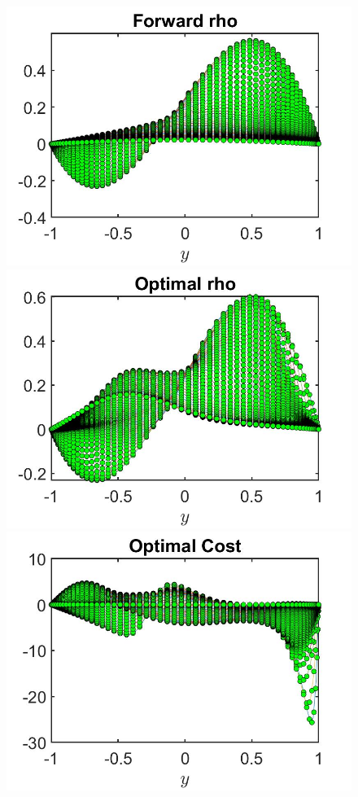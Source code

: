 \documentclass[11pt, a4paper]{article}
\theoremstyle{definition}
\begin{document}
\begin{figure}[h]
	\includegraphics[scale=0.3]{DFlrhoFW1.jpg}	
	\includegraphics[scale=0.3]{DFlrhoOpt1.jpg}
	\includegraphics[scale=0.3]{DFlwOpt.jpg}

\end{figure}
\end{document}
